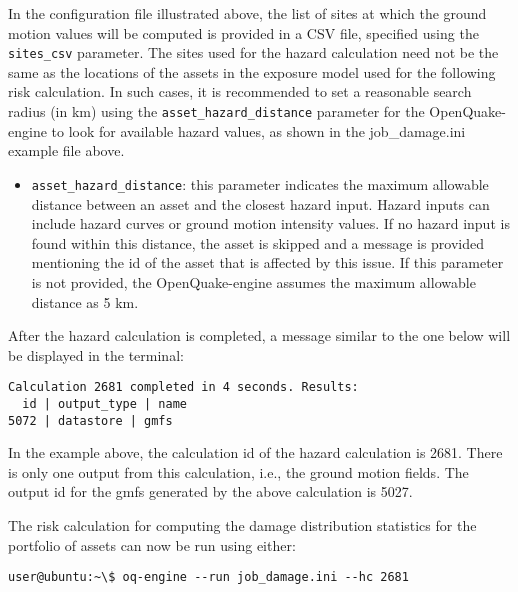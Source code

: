 In the configuration file illustrated above, the list of sites at which the
ground motion values will be computed is provided in a CSV file, specified
using the \Verb+sites_csv+ parameter. The sites used for the hazard
calculation  need not be the same as the locations of the assets in the
exposure model used  for the following risk calculation. In such cases, it is
recommended to set a reasonable search radius (in km) using the
\Verb+asset_hazard_distance+ parameter for the OpenQuake-engine to look for
available hazard values, as shown in the job_damage.ini example file above.

\begin{itemize}

  \item \Verb+asset_hazard_distance+: this parameter indicates the maximum
    allowable distance between an \gls{asset} and the closest hazard input.
    Hazard inputs can include hazard curves or ground motion intensity values.
    If no hazard input is found within this distance, the \gls{asset} is
    skipped and a message is provided mentioning the id of the asset that is
    affected by this issue. If this parameter is not provided, the
    OpenQuake-engine assumes the maximum allowable distance as 5 km.

\end{itemize}

After the hazard calculation is completed, a message similar to the one below
will be displayed in the terminal:

\begin{Verbatim}[frame=single, commandchars=\\\{\}, samepage=true]
Calculation 2681 completed in 4 seconds. Results:
  id | output_type | name
5072 | datastore | gmfs
\end{Verbatim}

In the example above, the calculation id of the hazard calculation is 2681.
There is only one output from this calculation, i.e., the ground motion
fields. The output id for the gmfs generated by the above calculation is 5027.

The risk calculation for computing the damage distribution statistics for the
portfolio of assets can now be run using either:

\begin{Verbatim}[frame=single, commandchars=\\\{\}, samepage=true]
user@ubuntu:~\$ oq-engine --run job_damage.ini --hc 2681
\end{Verbatim}

